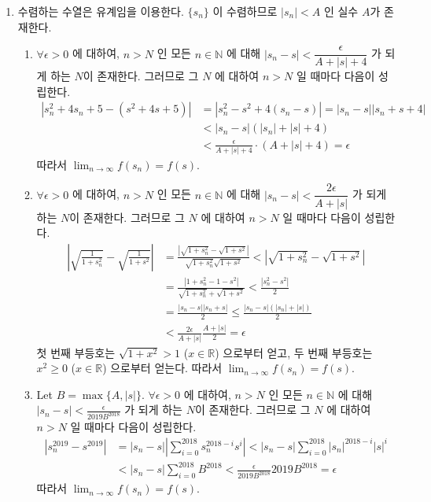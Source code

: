 \documentclass[12pt]{report}
\newcommand{\numl}[1]{\item[\large\textbf{\sffamily #1.}]}
\newcommand{\num}[1]{\item[\textbf{\sffamily #1}]}
\newcommand{\bb}[1]{\mathbb{#1}}
\newcommand{\ra}{\rightarrow}
\newcommand{\abs}[1]{\left|#1\right|}
\newcommand{\ds}{\displaystyle}
\begin{document}
\begin{enumerate}
\numl{7} 수렴하는 수열은 유계임을 이용한다. $\{s_n\}$ 이 수렴하므로 $\abs{s_n} < A$ 인 실수 $A$가 존재한다.
\begin{enumerate}
	\num{(1)} $\forall \epsilon > 0$ 에 대하여, $n>N$ 인 모든 $n\in\bb{N}$ 에 대해 $\abs{s_n-s} <\dfrac{\epsilon}{A + \abs{s} + 4}$ 가 되게 하는 $N$이 존재한다. 그러므로 그 $N$ 에 대하여 $n>N$ 일 때마다 다음이 성립한다.
	$$\begin{aligned}
		\abs{s_n^2 + 4s_n+5 - (s^2+4s+5)} &= \abs{s_n^2-s^2 + 4(s_n-s)} = \abs{s_n-s}\abs{s_n + s + 4} \\ &<\abs{s_n-s}(\abs{s_n} + \abs{s} + 4) \\&< \frac{\epsilon}{A + \abs{s} +4} \cdot (A + \abs{s} + 4) = \epsilon
	\end{aligned}$$
	따라서 $\ds\lim_{n \ra \infty} f(s_n) = f(s)$.
	\num{(2)} $\forall \epsilon > 0$ 에 대하여, $n>N$ 인 모든 $n\in\bb{N}$ 에 대해 $\abs{s_n-s} <\dfrac{2\epsilon}{A + \abs{s}}$ 가 되게 하는 $N$이 존재한다. 그러므로 그 $N$ 에 대하여 $n>N$ 일 때마다 다음이 성립한다.
	$$\begin{aligned}
		\abs{\sqrt{\frac{1}{1+s_n^2}}-\sqrt{\frac{1}{1+s^2}}} &= \frac{\abs{\sqrt{1+s_n^2} - \sqrt{1+s^2}}}{\sqrt{1+s_n^2}\sqrt{1+s^2}} < \abs{\sqrt{1+s_n^2} -\sqrt{1+s^2}} \\ &= \frac{\abs{1+s_n^2 - 1 - s^2}}{\sqrt{1+s_n^2} + \sqrt{1+s^2}} < \frac{\abs{s_n^2-s^2}}{2} \\ &= \frac{\abs{s_n-s}\abs{s_n+s}}{2} \leq \frac{\abs{s_n-s}(\abs{s_n} + \abs{s})}{2} \\ &< \frac{2\epsilon}{A + \abs{s}}\frac{A + \abs{s}}{2} = \epsilon
	\end{aligned}$$
	첫 번째 부등호는 $\sqrt{1+x^2}> 1$ ($x\in \bb{R}$) 으로부터 얻고, 두 번째 부등호는 $x^2 \geq 0$ ($x\in\bb{R}$) 으로부터 얻는다. 따라서 $\ds\lim_{n \ra \infty} f(s_n) = f(s)$.
	\num{(3)} Let $B = \max\{A, \abs{s}\}$. $\forall \epsilon > 0$ 에 대하여, $n>N$ 인 모든 $n\in\bb{N}$ 에 대해 $\abs{s_n-s} <\frac{\epsilon}{2019B^{2018}}$ 가 되게 하는 $N$이 존재한다. 그러므로 그 $N$ 에 대하여 $n>N$ 일 때마다 다음이 성립한다.
	$$\begin{aligned}
		\abs{s_n^{2019} - s^{2019}} &= \abs{s_n-s}\abs{\sum_{i=0}^{2018} s_n^{2018-i}s^i} < \abs{s_n-s}\sum_{i=0}^{2018} \abs{s_n}^{2018-i}\abs{s}^i \\ &<\abs{s_n-s}\sum_{i=0}^{2018} B^{2018} < \frac{\epsilon}{2019B^{2018}} 2019B^{2018} = \epsilon
	\end{aligned}$$
	 따라서 $\ds\lim_{n \ra \infty} f(s_n) = f(s)$.
\end{enumerate}


\end{enumerate}
\end{document}
